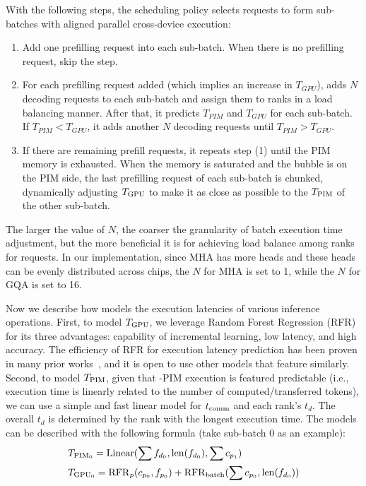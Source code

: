 With the following steps, the scheduling policy selects requests to form sub-batches with aligned parallel cross-device execution:
\begin{enumerate}
  \item Add one prefilling request into each sub-batch. When there is no prefilling request, skip the step.
  \item For each prefilling request added (which implies an increase in $T_{GPU}$), \sys adds $N$ decoding requests to each sub-batch and assign them to ranks in a load balancing manner. After that, it predicts $T_{PIM}$ and $T_{GPU}$ for each sub-batch. If $T_{PIM} < T_{GPU}$, it adds another $N$ decoding requests until $T_{PIM} > T_{GPU}$. 
  \item If there are remaining prefill requests, it repeats step (1) until the PIM memory is exhausted. 
  When the memory is saturated and the bubble is on the PIM side, the last prefilling request of each sub-batch is chunked, dynamically adjusting $T_{\rm GPU}$ to make it as close as possible to the $T_{\rm PIM}$ of the other sub-batch. 
\end{enumerate}

The larger the value of $N$, 
the coarser the granularity of batch execution time adjustment, 
but the more beneficial it is for achieving load balance among ranks for requests. 
In our implementation, since MHA has more heads and these heads can be evenly distributed across chips, the $N$ for MHA is set to 1, while the $N$ for GQA is set to 16.

\label{sec:runtime-profiling}
Now we describe how \sys models the execution latencies of various inference operations.
First, to model $T_{\rm GPU}$, we leverage Random Forest Regression (RFR) for its three advantages: capability of incremental learning, low latency, and high accuracy.
The efficiency of RFR for execution latency prediction has been proven in many prior works~\cite{liu2024jiagu,zhao2021gsight}, and it is open to use other models that feature similarly.
Second, to model $T_{\rm PIM}$, given that \sys-PIM execution is featured predictable (i.e., execution time is linearly related to the number of computed/transferred tokens),
we can use a simple and fast linear model for $t_{\rm comm}$ and each rank's $t_{d}$.
The overall $t_{d}$ is determined by the rank with the longest execution time.
The models can be described with the following formula (take sub-batch 0 as an example):
\begin{align*}
  &T_{{\rm PIM}_{0}} = {\rm Linear}(\sum{f_{d_{0}}}, {\rm len}(f_{d_{0}}), \sum{c_{p_{1}}}) \\
  &T_{{\rm GPU}_{0}} = {\rm RFR}_{p}(c_{p_{0}}, f_{p_{0}}) + {\rm RFR}_{\rm batch}(\sum{c_{p_{0}}}, {\rm len}(f_{d_{0}}))
\end{align*}

